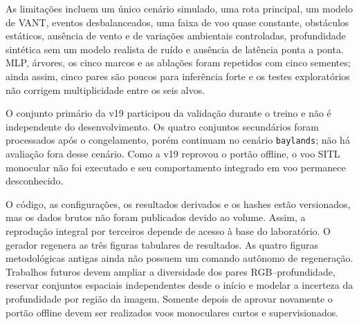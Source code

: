 \documentclass[article,a4paper,12pt,brazil,sumario=tradicional]{abntex2}
\begin{document}
As limitações incluem um único cenário simulado, uma rota principal, um modelo de VANT, eventos desbalanceados, uma faixa de voo quase constante, obstáculos estáticos, ausência de vento e de variações ambientais controladas, profundidade sintética sem um modelo realista de ruído e ausência de latência ponta a ponta. MLP, árvores, os cinco marcos e as ablações foram repetidos com cinco sementes; ainda assim, cinco pares são poucos para inferência forte e os testes exploratórios não corrigem multiplicidade entre os seis alvos.

O conjunto primário da v19 participou da validação durante o treino e não é independente do desenvolvimento. Os quatro conjuntos secundários foram processados após o congelamento, porém continuam no cenário \texttt{baylands}; não há avaliação fora desse cenário. Como a v19 reprovou o portão offline, o voo SITL monocular não foi executado e seu comportamento integrado em voo permanece desconhecido.

O código, as configurações, os resultados derivados e os hashes estão versionados, mas os dados brutos não foram publicados devido ao volume. Assim, a reprodução integral por terceiros depende de acesso à base do laboratório. O gerador  regenera as três figuras tabulares de resultados. As quatro figuras metodológicas antigas ainda não possuem um comando autônomo de regeneração. Trabalhos futuros devem ampliar a diversidade dos pares RGB--profundidade, reservar conjuntos espaciais independentes desde o início e modelar a incerteza da profundidade por região da imagem. Somente depois de aprovar novamente o portão offline devem ser realizados voos monoculares curtos e supervisionados.

\newpage

\end{document}
